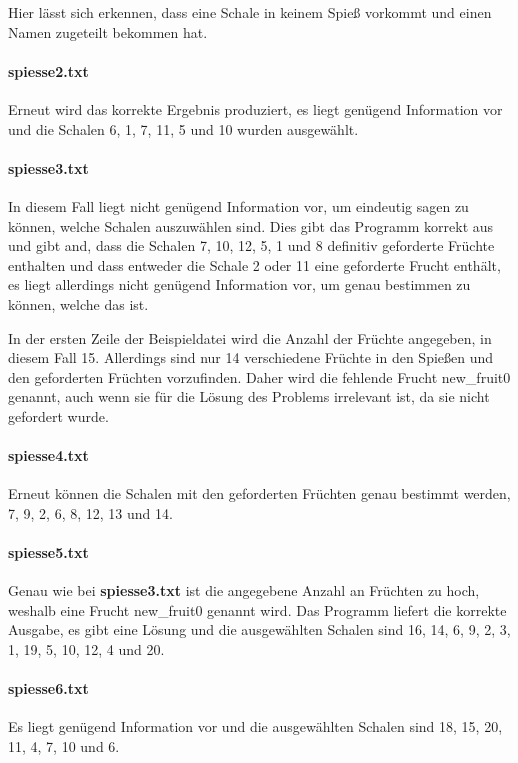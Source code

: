 \documentclass[a4paper,10pt,ngerman]{scrartcl}
\begin{document}
Hier lässt sich erkennen, dass eine Schale in keinem Spieß vorkommt und einen Namen zugeteilt bekommen hat.

\paragraph{spiesse2.txt}
Erneut wird das korrekte Ergebnis produziert, es liegt genügend Information vor und die Schalen 6, 1, 7, 11, 5 und 10 wurden ausgewählt.

\paragraph{spiesse3.txt}
In diesem Fall liegt nicht genügend Information vor, um eindeutig sagen zu können, welche Schalen auszuwählen sind.
Dies gibt das Programm korrekt aus und gibt and, dass die Schalen 7, 10, 12, 5, 1 und 8 definitiv geforderte Früchte enthalten und dass entweder die Schale 2 oder 11 eine geforderte Frucht enthält, es liegt allerdings nicht genügend Information vor, um genau bestimmen zu können, welche das ist.

In der ersten Zeile der Beispieldatei wird die Anzahl der Früchte angegeben, in diesem Fall 15.
Allerdings sind nur 14 verschiedene Früchte in den Spießen und den geforderten Früchten vorzufinden.
Daher wird die fehlende Frucht new\_fruit0 genannt, auch wenn sie für die Lösung des Problems irrelevant ist, da sie nicht gefordert wurde.

\paragraph{spiesse4.txt}
Erneut können die Schalen mit den geforderten Früchten genau bestimmt werden, 7, 9, 2, 6, 8, 12, 13 und 14.

\paragraph{spiesse5.txt}
Genau wie bei \textbf{spiesse3.txt} ist die angegebene Anzahl an Früchten zu hoch, weshalb eine Frucht new\_fruit0 genannt wird.
Das Programm liefert die korrekte Ausgabe, es gibt eine Lösung und die ausgewählten Schalen sind 16, 14, 6, 9, 2, 3, 1, 19, 5, 10, 12, 4 und 20.

\paragraph{spiesse6.txt}
Es liegt genügend Information vor und die ausgewählten Schalen sind 18, 15, 20, 11, 4, 7, 10 und 6.
\end{document}
